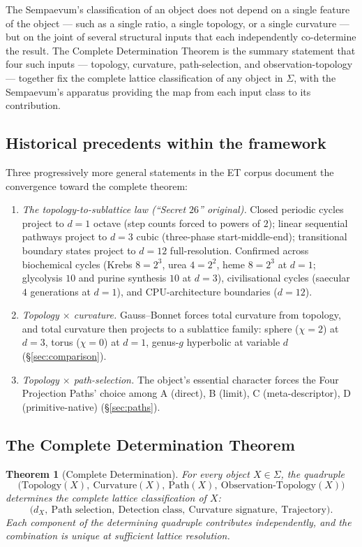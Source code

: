 \documentclass[11pt,a4paper]{article}
\newtheorem{theorem}{Theorem}[section]
\theoremstyle{definition}
\theoremstyle{remark}
\begin{document}
The Sempaevum's classification of an object does not depend on a single feature of the object --- such as a single ratio, a single topology, or a single curvature --- but on the joint of several structural inputs that each independently co-determine the result. The Complete Determination Theorem is the summary statement that four such inputs --- topology, curvature, path-selection, and observation-topology --- together fix the complete lattice classification of any object in $\Sigma$, with the Sempaevum's apparatus providing the map from each input class to its contribution.

\subsection{Historical precedents within the framework}

Three progressively more general statements in the ET corpus document the convergence toward the complete theorem:
\begin{enumerate}[leftmargin=*]
\item \emph{The topology-to-sublattice law (``Secret $26$'' original).} Closed periodic cycles project to $d=1$ octave (step counts forced to powers of $2$); linear sequential pathways project to $d=3$ cubic (three-phase start-middle-end); transitional boundary states project to $d=12$ full-resolution. Confirmed across biochemical cycles (Krebs $8=2^{3}$, urea $4=2^{2}$, heme $8=2^{3}$ at $d=1$; glycolysis $10$ and purine synthesis $10$ at $d=3$), civilisational cycles (saecular $4$ generations at $d=1$), and CPU-architecture boundaries ($d=12$).
\item \emph{Topology $\times$ curvature.} Gauss--Bonnet forces total curvature from topology, and total curvature then projects to a sublattice family: sphere ($\chi = 2$) at $d=3$, torus ($\chi = 0$) at $d=1$, genus-$g$ hyperbolic at variable $d$ (\S\ref{sec:comparison}).
\item \emph{Topology $\times$ path-selection.} The object's essential character forces the Four Projection Paths' choice among A (direct), B (limit), C (meta-descriptor), D (primitive-native) (\S\ref{sec:paths}).
\end{enumerate}

\subsection{The Complete Determination Theorem}

\begin{theorem}[Complete Determination]\label{thm:secret26}
For every object $X\in\Sigma$, the quadruple
\[
\bigl(\text{Topology}(X),\ \text{Curvature}(X),\ \text{Path}(X),\ \text{Observation-Topology}(X)\bigr)
\]
determines the complete lattice classification of $X$:
\[
\bigl(d_{X},\ \text{Path selection},\ \text{Detection class},\ \text{Curvature signature},\ \text{Trajectory}\bigr).
\]
Each component of the determining quadruple contributes independently, and the combination is unique at sufficient lattice resolution.
\end{theorem}
\end{document}
